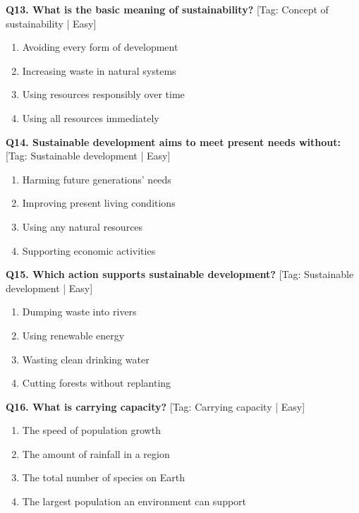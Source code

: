 \noindent\textbf{Q13. What is the basic meaning of sustainability?} \hfill [Tag: Concept of sustainability | Easy]
\begin{enumerate}[label=(\alph*),topsep=2pt,itemsep=1pt,partopsep=0pt,parsep=0pt]
    \item {Avoiding every form of development}
    \item {Increasing waste in natural systems}
    \item {Using resources responsibly over time}
    \item {Using all resources immediately}
\end{enumerate}
\vspace{2mm}

\noindent\textbf{Q14. Sustainable development aims to meet present needs without:} \hfill [Tag: Sustainable development | Easy]
\begin{enumerate}[label=(\alph*),topsep=2pt,itemsep=1pt,partopsep=0pt,parsep=0pt]
    \item {Harming future generations' needs}
    \item {Improving present living conditions}
    \item {Using any natural resources}
    \item {Supporting economic activities}
\end{enumerate}
\vspace{2mm}

\noindent\textbf{Q15. Which action supports sustainable development?} \hfill [Tag: Sustainable development | Easy]
\begin{enumerate}[label=(\alph*),topsep=2pt,itemsep=1pt,partopsep=0pt,parsep=0pt]
    \item {Dumping waste into rivers}
    \item {Using renewable energy}
    \item {Wasting clean drinking water}
    \item {Cutting forests without replanting}
\end{enumerate}
\vspace{2mm}

\noindent\textbf{Q16. What is carrying capacity?} \hfill [Tag: Carrying capacity | Easy]
\begin{enumerate}[label=(\alph*),topsep=2pt,itemsep=1pt,partopsep=0pt,parsep=0pt]
    \item {The speed of population growth}
    \item {The amount of rainfall in a region}
    \item {The total number of species on Earth}
    \item {The largest population an environment can support}
\end{enumerate}
\vspace{2mm}

